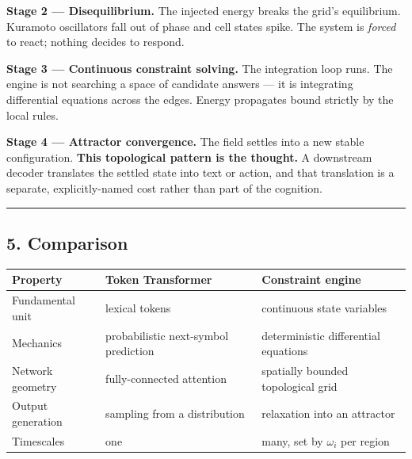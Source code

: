 \documentclass[
  11pt,
  a4paper,
]{article}
\begin{document}
\textbf{Stage 2 --- Disequilibrium.} The injected energy breaks the
grid's equilibrium. Kuramoto oscillators fall out of phase and cell
states spike. The system is \emph{forced} to react; nothing decides to
respond.

\textbf{Stage 3 --- Continuous constraint solving.} The integration loop
runs. The engine is not searching a space of candidate answers --- it is
integrating differential equations across the edges. Energy propagates
bound strictly by the local rules.

\textbf{Stage 4 --- Attractor convergence.} The field settles into a new
stable configuration. \textbf{This topological pattern is the thought.}
A downstream decoder translates the settled state into text or action,
and that translation is a separate, explicitly-named cost rather than
part of the cognition.

\begin{center}\rule{0.5\linewidth}{0.5pt}\end{center}

\subsection{5. Comparison}\label{comparison}

\begin{longtable}[]{@{}
  >{\raggedright\arraybackslash}p{}
  >{\raggedright\arraybackslash}p{}
  >{\raggedright\arraybackslash}p{}@{}}
\toprule\noalign{}
\begin{minipage}[b]{\linewidth}\raggedright
Property
\end{minipage} & \begin{minipage}[b]{\linewidth}\raggedright
Token Transformer
\end{minipage} & \begin{minipage}[b]{\linewidth}\raggedright
Constraint engine
\end{minipage} \\
\midrule\noalign{}
\endhead
\bottomrule\noalign{}
\endlastfoot
Fundamental unit & lexical tokens & continuous state variables \\
Mechanics & probabilistic next-symbol prediction & deterministic
differential equations \\
Network geometry & fully-connected attention & spatially bounded
topological grid \\
Output generation & sampling from a distribution & relaxation into an
attractor \\
Timescales & one & many, set by \(\omega_i\) per region \\
\end{longtable}
\end{document}
